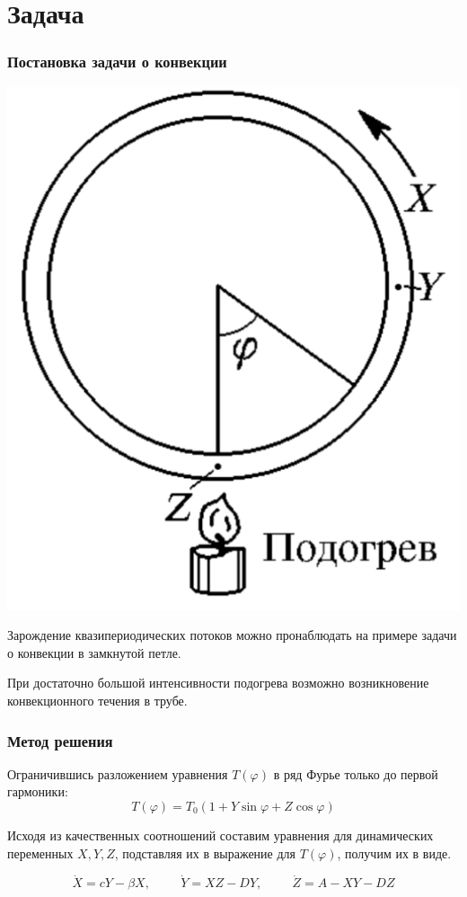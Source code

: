 \section{Задача}

\begin{frame}
	\frametitle{Постановка задачи о конвекции}

	\begin{minipage}{0.35\linewidth}
		\includegraphics[width = 1\linewidth]{img/knot.png}
	\end{minipage}
	\hfill
	\begin{minipage}{0.55\linewidth}
		Зарождение квазипериодических потоков можно пронаблюдать на примере задачи о конвекции в замкнутой петле.

		При достаточно большой интенсивности подогрева возможно возникновение конвекционного течения в трубе.
	\end{minipage}
	
\end{frame}

\begin{frame}
	\frametitle{Метод решения}
	Ограничившись разложением уравнения $T(\varphi)$ в ряд Фурье только до первой гармоники:
	$$T(\varphi) = T_0(1 + Y \sin \varphi + Z \cos \varphi)$$

	Исходя из качественных соотношений составим уравнения для динамических переменных $X, Y, Z$, подставляя их в выражение для $T(\varphi)$, получим их в виде.

	$$\dot{X} = c Y - \beta X,  \hspace{1cm} \dot{Y} = X Z - D Y, \hspace{1cm} \dot{Z} = A - X Y - D Z$$
\end{frame}

